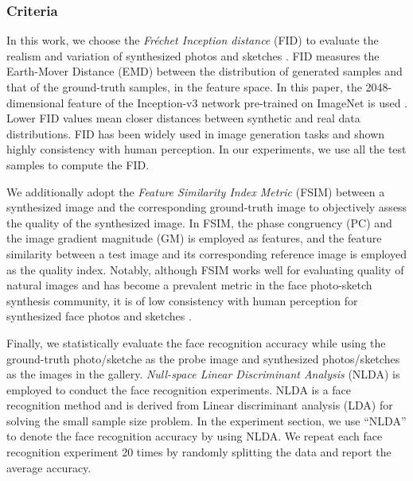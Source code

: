 \documentclass[journal]{IEEEtran}
\begin{document}
\subsubsection{Criteria}
\label{sec:criteria}
In this work, we choose the \textit{Fr\'{e}chet Inception distance} (FID) to evaluate the realism and variation of synthesized photos and sketches \cite{Heusel2017FID,Lucic2017Are}. 
FID measures the Earth-Mover Distance (EMD) between the distribution of generated samples and that of the ground-truth samples, in the feature space. In this paper, the 2048-dimensional feature of the Inception-v3 network pre-trained on ImageNet is used \cite{szegedy2016rethinking}.
Lower FID values mean closer distances between synthetic and real data distributions. FID has been widely used in image generation tasks and shown highly consistency with human perception. In our experiments, we use all the test samples to compute the FID. 

We additionally adopt the \textit{Feature Similarity Index Metric} (FSIM) \cite{Zhang2011FSIM} between a synthesized image and the corresponding ground-truth image to objectively assess the quality of the synthesized image. 
In FSIM, the phase congruency (PC) and the image gradient magnitude (GM) is employed as features, and the feature similarity between a test image and its corresponding reference image is employed as the quality index. 
Notably, although FSIM works well for evaluating quality of natural images and has become a prevalent metric in the face photo-sketch synthesis community, it is of low consistency with human perception for synthesized face photos and sketches \cite{Wang2016Evaluation}. 

Finally, we statistically evaluate the face recognition accuracy while using the ground-truth photo/sketche as the probe image and synthesized photos/sketches as the images in the gallery. 
\textit{Null-space Linear Discriminant Analysis} (NLDA) \cite{Ref28} is employed to conduct the face recognition experiments. 
NLDA is a face recognition method and is derived from Linear discriminant analysis (LDA) for solving the small sample size problem. In the experiment section, we use “NLDA” to denote the face recognition accuracy by using NLDA.
We repeat each face recognition experiment 20 times by randomly splitting the data and report the average accuracy.
\end{document}
